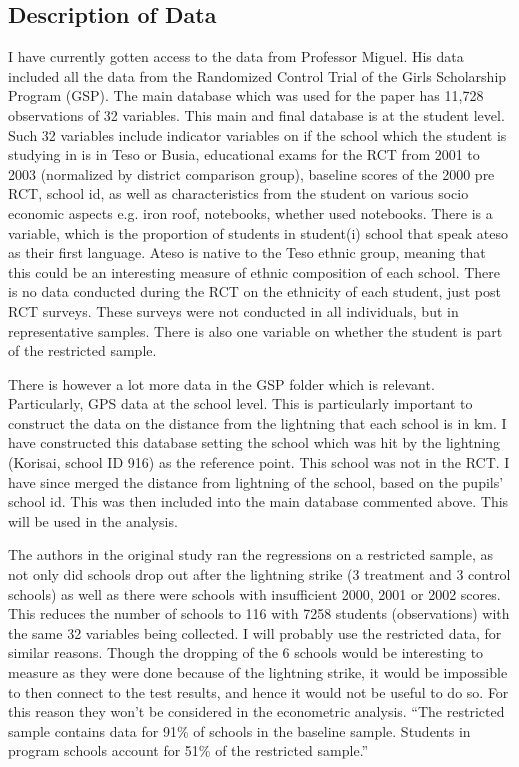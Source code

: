 \documentclass{article}
\begin{document}
\subsection{Description of Data}

I have currently gotten access to the data from Professor Miguel. His data included all the data from the Randomized Control Trial of the Girls Scholarship Program (GSP). The main database which was used for the paper has 11,728 observations of 32 variables. This main and final database is at the student level. Such 32 variables include indicator variables on if the school which the student is studying in is in Teso or Busia, educational exams for the RCT from 2001 to 2003 (normalized by district comparison group), baseline scores of the 2000 pre RCT, school id, as well as characteristics from the student on various socio economic aspects e.g. iron roof, notebooks, whether used notebooks. There is a variable, which is the proportion of students in student(i) school that speak ateso as their first language. Ateso is native to the Teso ethnic group, meaning that this could be an interesting measure of ethnic composition of each school. There is no data conducted during the RCT on the ethnicity of each student, just post RCT surveys. These surveys were not conducted in all individuals, but in representative samples. There is also one variable on whether the student is part of the restricted sample. 

There is however a lot more data in the GSP folder which is relevant. Particularly, GPS data at the school level. This is particularly important to construct the data on the distance from the lightning that each school is in km. I have constructed this database setting the school which was hit by the lightning (Korisai, school ID 916) as the reference point. This school was not in the RCT. I have since merged the distance from lightning of the school, based on the pupils' school id. This was then included into the main database commented above. This will be used in the analysis. 

The authors in the original study ran the regressions on a restricted sample, as not only did schools drop out after the lightning strike (3 treatment and 3 control schools) as well as there were schools with insufficient 2000, 2001 or 2002 scores. This reduces the number of schools to 116 with 7258 students (observations) with the same 32 variables being collected. I will probably use the restricted data, for similar reasons. Though the dropping of the 6 schools would be interesting to measure as they were done because of the lightning strike, it would be impossible to then connect to the test results, and hence it would not be useful to do so. For this reason they won't be considered in the econometric analysis. “The restricted sample contains data for 91\% of schools in the baseline sample. Students in program schools account for 51\% of the restricted sample.” \autocites{kremer-miguel-thornton-2009} 
\end{document}
